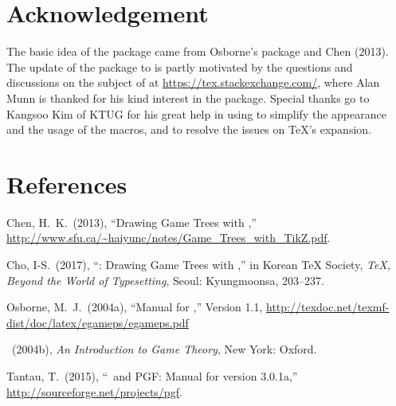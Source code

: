 \section{Acknowledgement}

The basic idea of the  package came from Osborne's  package and Chen (2013). 
The update of the package  to  is partly motivated by the questions and discussions on the subject of  at \url{https://tex.stackexchange.com/}, where Alan Munn is thanked for his kind interest in the  package.
Special thanks go to Kangsoo Kim of KTUG for his great help in using  to simplify the appearance and the usage of the macros, and to resolve the issues on \TeX's expansion.


\section{References}
\hpara{}Chen, H.~K.~(2013), ``Drawing Game Trees with \TikZ,'' \url{http://www.sfu.ca/~haiyunc/notes/Game_Trees_with_TikZ.pdf}.

\hpara{}Cho, I-S.~(2017), ``: Drawing Game Trees with \TikZ,'' in Korean TeX Society, \emph{\TeX, Beyond the World of Typesetting}, Seoul: Kyungmoonsa, 203--237.

\hpara{}Osborne, M.~J.~(2004a), ``Manual for ,'' Version 1.1, \url{http://texdoc.net/texmf-dist/doc/latex/egameps/egameps.pdf}

\hpara{}\uline{\hphantom{Osborne, M.~J}}~(2004b), \emph{An Introduction to Game Theory}, New York: Oxford.

\hpara{}Tantau, T.~(2015), ``\TikZ\ and PGF: Manual for version 3.0.1a,'' \url{http://sourceforge.net/projects/pgf}.

%
%
%
%
%
%
